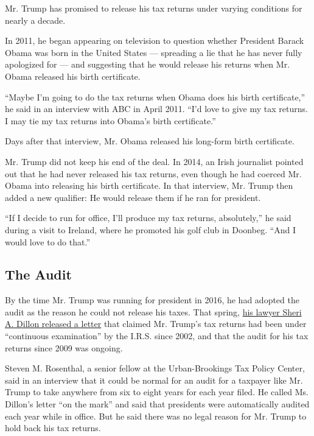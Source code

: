 Mr. Trump has promised to release his tax returns under varying
conditions for nearly a decade.

In 2011, he began appearing on television to question whether President
Barack Obama was born in the United States --- spreading a lie that he
has never fully apologized for --- and suggesting that he would release
his returns when Mr. Obama released his birth certificate.

``Maybe I'm going to do the tax returns when Obama does his birth
certificate,'' he said in an interview with ABC in April 2011. ``I'd
love to give my tax returns. I may tie my tax returns into Obama's birth
certificate.''

Days after that interview, Mr. Obama released his long-form birth
certificate.

Mr. Trump did not keep his end of the deal. In 2014, an Irish journalist
pointed out that he had never released his tax returns, even though he
had coerced Mr. Obama into releasing his birth certificate. In that
interview, Mr. Trump then added a new qualifier: He would release them
if he ran for president.

``If I decide to run for office, I'll produce my tax returns,
absolutely,'' he said during a visit to Ireland, where he promoted his
golf club in Doonbeg. ``And I would love to do that.''

\hypertarget{the-audit}{%
\subsection{The Audit}\label{the-audit}}

By the time Mr. Trump was running for president in 2016, he had adopted
the audit as the reason he could not release his taxes. That spring,
\href{https://assets.donaldjtrump.com/Tax_Doc.pdf}{his lawyer Sheri A.
Dillon released a letter} that claimed Mr. Trump's tax returns had been
under ``continuous examination'' by the I.R.S. since 2002, and that the
audit for his tax returns since 2009 was ongoing.

Steven M. Rosenthal, a senior fellow at the Urban-Brookings Tax Policy
Center, said in an interview that it could be normal for an audit for a
taxpayer like Mr. Trump to take anywhere from six to eight years for
each year filed. He called Ms. Dillon's letter ``on the mark'' and said
that presidents were automatically audited each year while in office.
But he said there was no legal reason for Mr. Trump to hold back his tax
returns.

